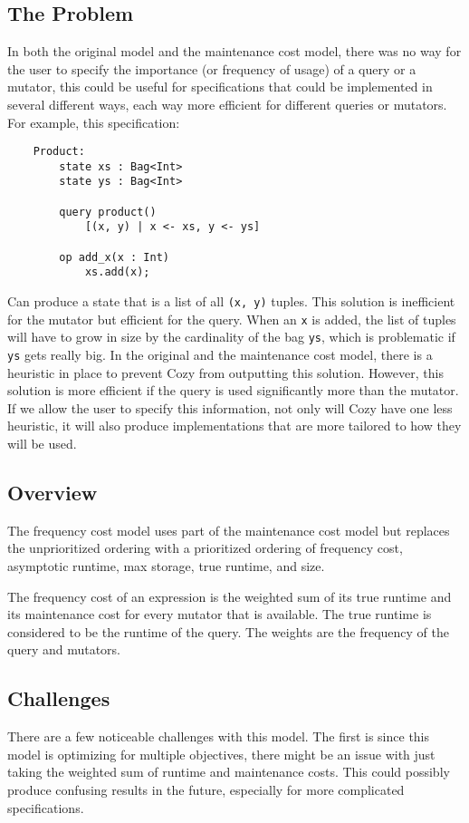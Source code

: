 \newcommand{\code}[1]{\texttt{#1}}

\subsection{The Problem}
In both the original model and the maintenance cost model, there was no way for
the user to specify the importance (or frequency of usage) of a query or a
mutator, this could be useful for specifications that could be implemented in
several different ways, each way more efficient for different queries or
mutators. For example, this specification:

\begin{lstlisting}
    Product:
        state xs : Bag<Int>
        state ys : Bag<Int>

        query product()
            [(x, y) | x <- xs, y <- ys]

        op add_x(x : Int)
            xs.add(x);
\end{lstlisting}

Can produce a state that is a list of all \code{(x, y)} tuples. This solution is
inefficient for the mutator but efficient for the query. When an \code{x} is
added, the list of tuples will have to grow in size by the cardinality of the bag
\code{ys}, which is problematic if \code{ys} gets really big. In the original
and the maintenance cost model, there is a heuristic in place to prevent Cozy
from outputting this solution. However, this solution is more efficient if
the query is used significantly more than the mutator. If we allow the user to
specify this information, not only will Cozy have one less heuristic, it will
also produce implementations that are more tailored to how they will be used.

\subsection{Overview}
The frequency cost model uses part of the maintenance cost model but replaces
the unprioritized ordering with a prioritized ordering of frequency cost,
asymptotic runtime, max storage, true runtime, and size.

The frequency cost of an expression is the weighted sum of its true runtime and
its maintenance cost for every mutator that is available. The true runtime is
considered to be the runtime of the query. The weights are the frequency of the
query and mutators.

\subsection{Challenges}
There are a few noticeable challenges with this model. The first is since this
model is optimizing for multiple objectives, there might be an issue with just
taking the weighted sum of runtime and maintenance costs. This could possibly
produce confusing results in the future, especially for more complicated
specifications.


